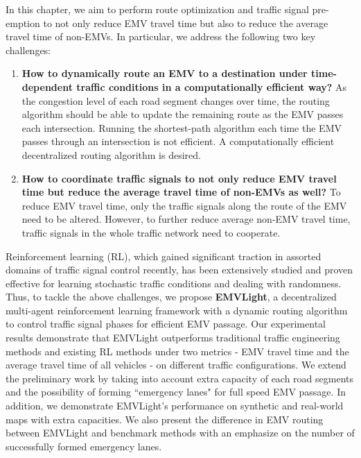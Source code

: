 In this chapter, we aim to perform route optimization and traffic signal pre-emption to not only reduce EMV travel time but also to reduce the average travel time of non-EMVs. In particular, we address the following two key challenges:
\begin{enumerate}
    \item \textbf{How to dynamically route an EMV to a destination under time-dependent traffic conditions in a computationally efficient way?} As the congestion level of each road segment changes over time, the routing algorithm should be able to update the remaining route as the EMV passes each intersection. Running the shortest-path algorithm each time the EMV passes through an intersection is not efficient. A computationally efficient decentralized routing algorithm is desired. \label{challenge_1}
    \item \textbf{How to coordinate traffic signals to not only reduce EMV travel time but reduce the average travel time of non-EMVs as well?} To reduce EMV travel time, only the traffic signals along the route of the EMV need to be altered. However, to further reduce average non-EMV travel time, traffic signals in the whole traffic network need to cooperate. \label{challenge_2} 
\end{enumerate}

Reinforcement learning (RL), which gained significant traction in assorted domains of traffic signal control recently, has been extensively studied and proven effective for learning stochastic traffic conditions and dealing with randomness.
Thus, to tackle the above challenges, we propose \textbf{EMVLight}, a decentralized multi-agent reinforcement learning framework with a dynamic routing algorithm to control traffic signal phases for efficient EMV passage.  Our experimental results demonstrate that EMVLight outperforms traditional traffic engineering methods and existing RL methods under two metrics - EMV travel time and the average travel time of all vehicles - on different traffic configurations. We extend the preliminary work \cite{Su2021EMVLight} by taking into account extra capacity of each road segments and the possibility of forming ``emergency lanes" for full speed EMV passage. In addition, we demonstrate EMVLight's performance on synthetic and real-world maps with extra capacities. We also present the difference in EMV routing between EMVLight and benchmark methods with an emphasize on the number of successfully formed emergency lanes.

